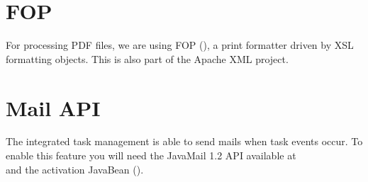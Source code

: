 \section{FOP}
For processing PDF files, we are using FOP 
(),
a print formatter driven by XSL formatting objects. This is also part
of the Apache XML project.

\section{Mail API}
The integrated task management is able to send mails when task events occur.
To enable this feature you will need the JavaMail 1.2 API available at \\ 
 and the activation JavaBean 
().